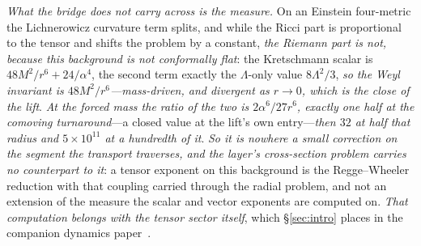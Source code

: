 \documentclass[11pt,a4paper]{article}
\theoremstyle{plain}
\theoremstyle{definition}
\theoremstyle{remark}
\begin{document}
\emph{What the bridge does not carry across is the measure.} On an Einstein four-metric the Lichnerowicz curvature term splits, and while the Ricci part is proportional to the tensor and shifts the problem by a constant, \emph{the Riemann part is not, because this background is not conformally flat}: the Kretschmann scalar is $48M^2/r^6+24/\alpha^4$, the second term exactly the $\Lambda$-only value $8\Lambda^2/3$, \emph{so the Weyl invariant is $48M^2/r^6$---mass-driven, and divergent as $r\to0$, which is the close of the lift}. \emph{At the forced mass the ratio of the two is $2\alpha^6/27r^6$, exactly one half at the comoving turnaround}---a closed value at the lift's own entry---\emph{then $32$ at half that radius and $5\times10^{11}$ at a hundredth of it}. \emph{So it is nowhere a small correction on the segment the transport traverses, and the layer's cross-section problem carries no counterpart to it}: a tensor exponent on this background is the Regge--Wheeler reduction with that coupling carried through the radial problem, and not an extension of the measure the scalar and vector exponents are computed on. \emph{That computation belongs with the tensor sector itself}, which \S\ref{sec:intro} places in the companion dynamics paper~\cite{JanzenDynamics}.
\end{document}
